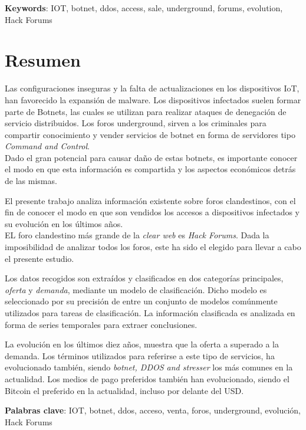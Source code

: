 \vspace{1.0cm}

\textbf{Keywords}: IOT, botnet, ddos, access, sale, underground, forums, evolution, Hack Forums

\chapter*{Resumen}

\onehalfspacing

Las configuraciones inseguras y la falta de actualizaciones en los dispositivos IoT, han favorecido la expansión de malware. Los dispositivos infectados suelen formar parte de Botnets, las cuales se utilizan para realizar ataques de denegación de servicio distribuidos. Los foros underground, sirven a los criminales para compartir conocimiento y vender servicios de botnet en forma de servidores tipo \textit{Command and Control}. \\
Dado el gran potencial para causar daño de estas botnets, es importante conocer el modo en que esta información es compartida y los aspectos económicos detrás de las mismas.

El presente trabajo analiza información existente sobre foros clandestinos, con el fin de conocer el modo en que son vendidos los accesos a dispositivos infectados y su evolución en los últimos años. \\
EL foro clandestino más grande de la \textit{clear web} es \textit{Hack Forums}. Dada la imposibilidad de analizar todos los foros, este ha sido el elegido para llevar a cabo el presente estudio.

Los datos recogidos son extraídos y clasificados en dos categorías principales, \textit{oferta} y \textit{demanda}, mediante un modelo de clasificación. Dicho modelo es seleccionado por su precisión de entre un conjunto de modelos comúnmente utilizados para tareas de clasificación. La información clasificada es analizada en forma de series temporales para extraer conclusiones.

La evolución en los últimos diez años, muestra que la oferta a superado a la demanda. Los términos utilizados para referirse a este tipo de servicios, ha evolucionado también, siendo \textit{botnet, DDOS and stresser} los más comunes en la actualidad. Los medios de pago preferidos también han evolucionado, siendo el Bitcoin el preferido en la actualidad, incluso por delante del USD.

\vspace{1.0cm}

\textbf{Palabras clave}: IOT, botnet, ddos, acceso, venta, foros, underground, evolución, Hack Forums
